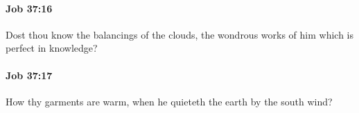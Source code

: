 		\paragraph{Job 37:16} %
			\label{JOB-37-16}

			Dost thou know the balancings of the clouds, the wondrous works of him which is perfect in knowledge?


		\paragraph{Job 37:17} %
			\label{JOB-37-17}

			How thy garments are warm, when he quieteth the earth by the south wind?


